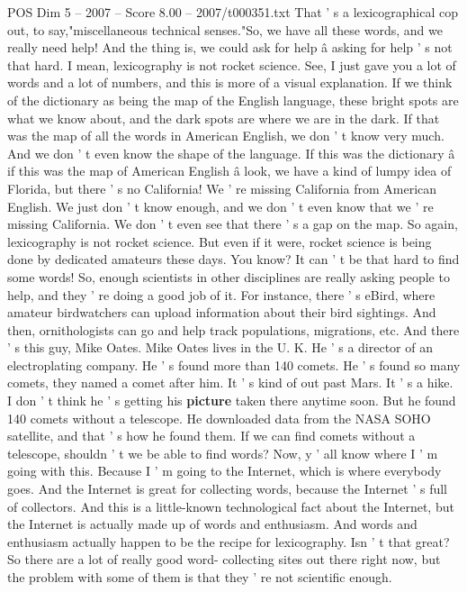 \begin{textsample}{POS Dim 5 – 2007 – Score 8.00 – 2007/t000351.txt}
That ' s a lexicographical cop out, to say,"miscellaneous technical senses."So, we have all these words, and we really need help!
And the thing is, we could ask for help â asking for help ' s not that hard.
I mean, lexicography is not rocket science.
See, I just gave you a lot of words and a lot of numbers, and this is more of a visual explanation.
If we think of the dictionary as being the map of the English language, these bright spots are what we know about, and the dark spots are where we are in the dark.
If that was the map of all the words in American English, we don ' t know very much.
And we don ' t even know the shape of the language.
If this was the dictionary â if this was the map of American English â look, we have a kind of lumpy idea of Florida, but there ' s no California!
We ' re missing California from American English.
We just don ' t know enough, and we don ' t even know that we ' re missing California.
We don ' t even see that there ' s a gap on the map.
So again, lexicography is not rocket science.
But even if it were, rocket science is being done by dedicated amateurs these days.
You know?
It can ' t be that hard to find some words!
So, enough scientists in other disciplines are really asking people to help, and they ' re doing a good job of it.
For instance, there ' s eBird, where amateur birdwatchers can upload information about their bird sightings.
And then, ornithologists can go and help track populations, migrations, etc.
And there ' s this guy, Mike Oates.
Mike Oates lives in the U.
K.
He ' s a director of an electroplating company.
He ' s found more than 140 comets.
He ' s found so many comets, they named a comet after him.
It ' s kind of out past Mars.
It ' s a hike.
I don ' t think he ' s getting his \textbf{picture} taken there anytime soon.
But he found 140 comets without a telescope.
He downloaded data from the NASA SOHO satellite, and that ' s how he found them.
If we can find comets without a telescope, shouldn ' t we be able to find words?
Now, y ' all know where I ' m going with this.
Because I ' m going to the Internet, which is where everybody goes.
And the Internet is great for collecting words, because the Internet ' s full of collectors.
And this is a little-known technological fact about the Internet, but the Internet is actually made up of words and enthusiasm.
And words and enthusiasm actually happen to be the recipe for lexicography.
Isn ' t that great?
So there are a lot of really good word- collecting sites out there right now, but the problem with some of them is that they ' re not scientific enough.

\end{textsample}
